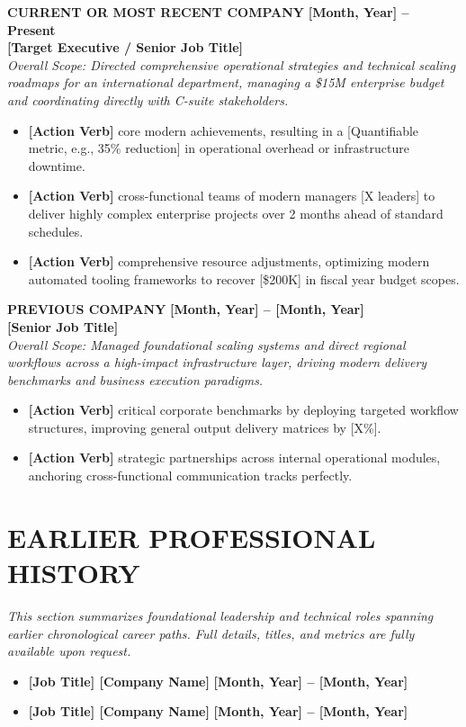 \documentclass[10pt,a4paper]{article}
\newcommand{\resumeline}{\vspace{-8pt}\noindent\makebox[\linewidth]{\rule{\linewidth}{0.5pt}}\vspace{4pt}}
\begin{document}
	\noindent \textbf{CURRENT OR MOST RECENT COMPANY} \hfill \textbf{[Month, Year] -- Present} \\
	\noindent \textbf{[Target Executive / Senior Job Title]} \\
	\noindent \textit{Overall Scope: Directed comprehensive operational strategies and technical scaling roadmaps for an international department, managing a \$15M enterprise budget and coordinating directly with C-suite stakeholders.}
	\begin{itemize}
		\item \textbf{[Action Verb]} core modern achievements, resulting in a [Quantifiable metric, e.g., 35\% reduction] in operational overhead or infrastructure downtime.
		\item \textbf{[Action Verb]} cross-functional teams of modern managers [X leaders] to deliver highly complex enterprise projects over 2 months ahead of standard schedules.
		\item \textbf{[Action Verb]} comprehensive resource adjustments, optimizing modern automated tooling frameworks to recover [\$200K] in fiscal year budget scopes.
	\end{itemize}
	
	\vspace{6pt}
	
	\noindent \textbf{PREVIOUS COMPANY} \hfill \textbf{[Month, Year] -- [Month, Year]} \\
	\noindent \textbf{[Senior Job Title]} \\
	\noindent \textit{Overall Scope: Managed foundational scaling systems and direct regional workflows across a high-impact infrastructure layer, driving modern delivery benchmarks and business execution paradigms.}
	\begin{itemize}
		\item \textbf{[Action Verb]} critical corporate benchmarks by deploying targeted workflow structures, improving general output delivery matrices by [X\%].
		\item \textbf{[Action Verb]} strategic partnerships across internal operational modules, anchoring cross-functional communication tracks perfectly.
	\end{itemize}
	
	\section*{EARLIER PROFESSIONAL HISTORY}
	\resumeline
	
	\noindent \textit{This section summarizes foundational leadership and technical roles spanning earlier chronological career paths. Full details, titles, and metrics are fully available upon request.}
	\begin{itemize}
		\item \textbf{[Job Title] \textbar{} [Company Name]} \hfill \textbf{[Month, Year] -- [Month, Year]}
		\item \textbf{[Job Title] \textbar{} [Company Name]} \hfill \textbf{[Month, Year] -- [Month, Year]}
	\end{itemize}
	
\end{document}
